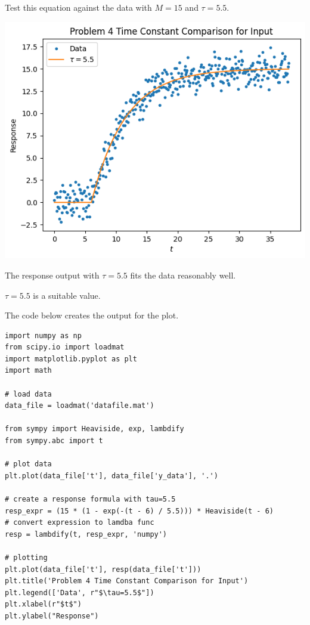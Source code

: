 \documentclass[12pt]{article}
\begin{document}
\begin{enumerate}
\begin{enumerate}
    Test this equation against the data with $M=15$ and $\tau=5.5$.

    \includegraphics{461HW4_P4_2.png}

    The response output with $\tau=5.5$ fits the data reasonably well.

    $\boxed{\tau=5.5}$ is a suitable value.


    The code below creates the output for the plot.
    
\newpage

\begin{verbatim}
import numpy as np
from scipy.io import loadmat
import matplotlib.pyplot as plt
import math

# load data
data_file = loadmat('datafile.mat')

from sympy import Heaviside, exp, lambdify
from sympy.abc import t

# plot data
plt.plot(data_file['t'], data_file['y_data'], '.')

# create a response formula with tau=5.5
resp_expr = (15 * (1 - exp(-(t - 6) / 5.5))) * Heaviside(t - 6)
# convert expression to lamdba func
resp = lambdify(t, resp_expr, 'numpy')

# plotting
plt.plot(data_file['t'], resp(data_file['t']))
plt.title('Problem 4 Time Constant Comparison for Input')
plt.legend(['Data', r"$\tau=5.5$"])
plt.xlabel(r"$t$")
plt.ylabel("Response")
\end{verbatim}

\end{enumerate}




\end{enumerate}
\end{document}
